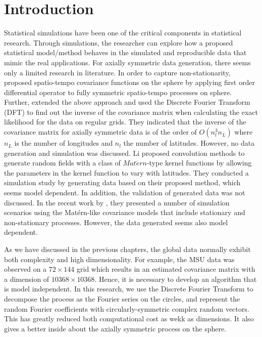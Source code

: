 %
%
%



\section{Introduction}

Statistical simulations have been one of the critical components in statistical research. Through simulations, the researcher can explore how a proposed statistical model/method behaves in the simulated and reproducible data that mimic the real applications. For axially symmetric data generation, there seems only a limited research in literature. In order to capture non-stationarity, \cite{JunStein2007} proposed spatio-tempo covariance functions on the sphere by applying first order differential operator to fully symmetric spatio-tempo processes on sphere. Further, \cite{JunStein2008} extended the above approach and used the Discrete Fourier Transform (DFT) to find out the inverse of the covariance matrix when calculating the exact likelihood for the data on regular grids. They indicated that the inverse of the covariance matrix for axially symmetric data is of the order of $O(n_l^3 n_L)$ where $n_L$ is the number of longitudes and $n_l$ the number of latitudes. However, no data generation and simulation was discussed. Li \cite{Li2013} proposed convolution methods to generate random fields with a class of $Mat\acute{e}rn$-type kernel functions by allowing the parameters in the kernel function to vary with latitudes. They conducted a simulation study by generating data based on their proposed method, which seems model dependent. In addition, the validation of generated data was not discussed. In the recent work by \cite{JeongJun2015}, they presented a number of simulation scenarios using the Mat\'{e}rn-like covariance models that include stationary and non-stationary processes. However, the data generated seems also model dependent. 

As we have discussed in the previous chapters, the global data normally exhibit both complexity and high dimensionality. For example, the MSU data was observed on a $72 \times 144$ grid which results in an estimated covariance matrix with a dimension of $10368\times 10368$. Hence, it is necessary to develop an algorithm that is model independent. In this research, we use the Discrete Fourier Transform to decompose the process as the Fourier series on the circles, and represent the random Fourier coefficients with circularly-symmetric complex random vectors. This has greatly reduced both computational cost as wekk as dimensions. It also gives a better inside about the axially symmetric process on the sphere.

